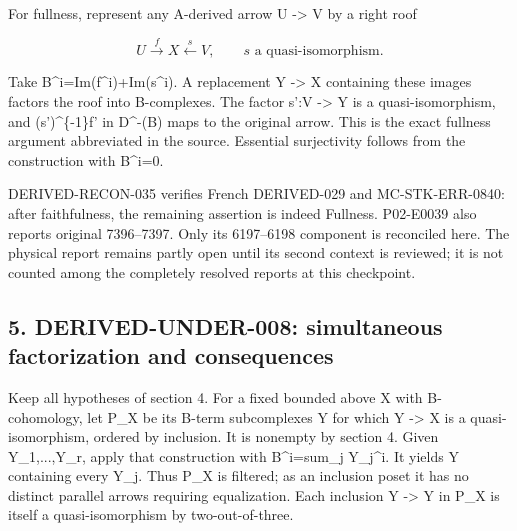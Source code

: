 \documentclass[11pt]{article}
\begin{document}
For fullness,\allowbreak{} represent any A-derived arrow U \allowbreak{}-> V by a right roof

\[
 U\xrightarrow{f}X\xleftarrow{s}V,\qquad s\text{ a quasi-isomorphism}.
                                                               \tag{4.4}
\]

Take B\textasciicircum{}i\allowbreak{}=Im(f\textasciicircum{}i)\allowbreak{}\allowbreak{}+Im(s\textasciicircum{}i)\allowbreak{}. A replacement Y \allowbreak{}-> X containing these images factors the roof into B-complexes. The factor s':\allowbreak{}V \allowbreak{}-> Y is a quasi-isomorphism,\allowbreak{} and (s')\allowbreak{}\textasciicircum{}\{-1\}f' in D\textasciicircum{}-(B)\allowbreak{} maps to the original arrow. This is the exact fullness argument abbreviated in the source. Essential surjectivity follows from the construction with B\textasciicircum{}i\allowbreak{}=0.

DERIVED-RECON-035 verifies French DERIVED-029 and MC-STK-ERR-0840:\allowbreak{} after faithfulness,\allowbreak{} the remaining assertion is indeed Fullness. P02-E0039 also reports original 7396–\allowbreak{}7397. Only its 6197–\allowbreak{}6198 component is reconciled here. The physical report remains partly open until its second context is reviewed; it is not counted among the completely resolved reports at this checkpoint.

\subsection{\texorpdfstring{5. DERIVED-UNDER-008:\allowbreak{} simultaneous factorization and consequences}{5.  simultaneous factorization and consequences}}\label{proofs-5910-6199-derived-under-008-simultaneous-factorization-and-consequences}

Keep all hypotheses of section 4. For a fixed bounded above X with B-cohomology,\allowbreak{} let P\_\allowbreak{}X be its B-term subcomplexes Y for which Y \allowbreak{}-> X is a quasi-isomorphism,\allowbreak{} ordered by inclusion. It is nonempty by section 4. Given Y\_\allowbreak{}1,\allowbreak{}...,\allowbreak{}Y\_\allowbreak{}r,\allowbreak{} apply that construction with B\textasciicircum{}i\allowbreak{}=sum\_\allowbreak{}j Y\_\allowbreak{}j\textasciicircum{}i. It yields Y containing every Y\_\allowbreak{}j. Thus P\_\allowbreak{}X is filtered; as an inclusion poset it has no distinct parallel arrows requiring equalization. Each inclusion Y \allowbreak{}-> Y\textquotesingle{} in P\_\allowbreak{}X is itself a quasi-isomorphism by two-out-of-three.
\end{document}
